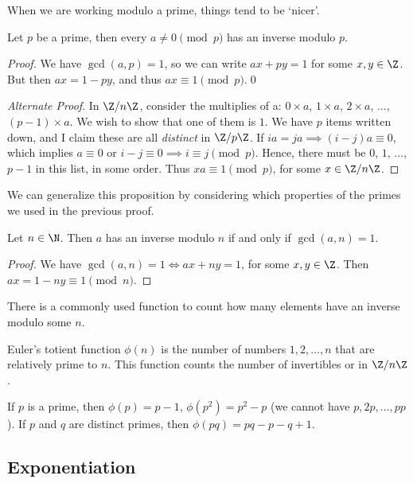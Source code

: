 \documentclass[a4paper]{scrreprt}
\begin{document}
When we are working modulo a prime, things tend to be `nicer'.

\begin{proposition}
	Let $p$ be a prime, then every $a \neq 0 \pmod{p}$ has an inverse modulo $p$.
\end{proposition}
\begin{proof}
	We have $\gcd(a, p) = 1$, so we can write $ax + py = 1$ for some $x,y \in \Z$. But then $ax = 1 - py$, and thus $ax \equiv 1 \pmod{p}$.\hfill\qed

	\emph{Alternate Proof}. 
	In $\Z/n\Z$, consider the multiplies of a: $0\times a$, $1 \times a$, $2 
	\times a$, $\dots$, $(p - 1)\times a$. We wish to show that one of them is $1$. We have $p$ items written down, and I claim these are all \emph{distinct} in $\Z/p\Z$. If $ia = ja \implies (i - j)a \equiv 0$, which implies $a \equiv 0$ or $i -j \equiv 0 \implies i \equiv j \pmod{p}$. Hence, there must be $0$, $1$, $\dots$, $p - 1$ in this list, in some order. Thus $xa \equiv 1 \pmod{p}$, for some $x \in \Z/n\Z$.
\end{proof}

We can generalize this proposition by considering which properties of the primes we used in the previous proof.

\begin{proposition}
	Let $n \in \N$. Then $a$ has an inverse modulo $n$ if and only if $\gcd(a, n) = 1$.
\end{proposition}
\begin{proof}
	We have $\gcd(a, n) = 1 \iff ax + ny = 1$, for some $x, y \in \Z$. Then $ax = 1 - ny \equiv 1 \pmod{n}$.
\end{proof}

There is a commonly used function to count how many elements have an inverse modulo some $n$.

\begin{definition}
	Euler's totient function $\phi(n)$ is the number of numbers $1, 2, \dots, n$ that are relatively prime to $n$.
	This function counts the number of invertibles or  in $\Z/n\Z$.
\end{definition}

\begin{example}
	If $p$ is a prime, then $\phi(p) = p - 1$, $\phi(p^2) = p^2 - p$ (we cannot have $p, 2p, \dots, pp$). If $p$ and $q$ are distinct primes, then $\phi(pq) = pq - p - q + 1$.
\end{example}

\subsection{Exponentiation}
\end{document}
